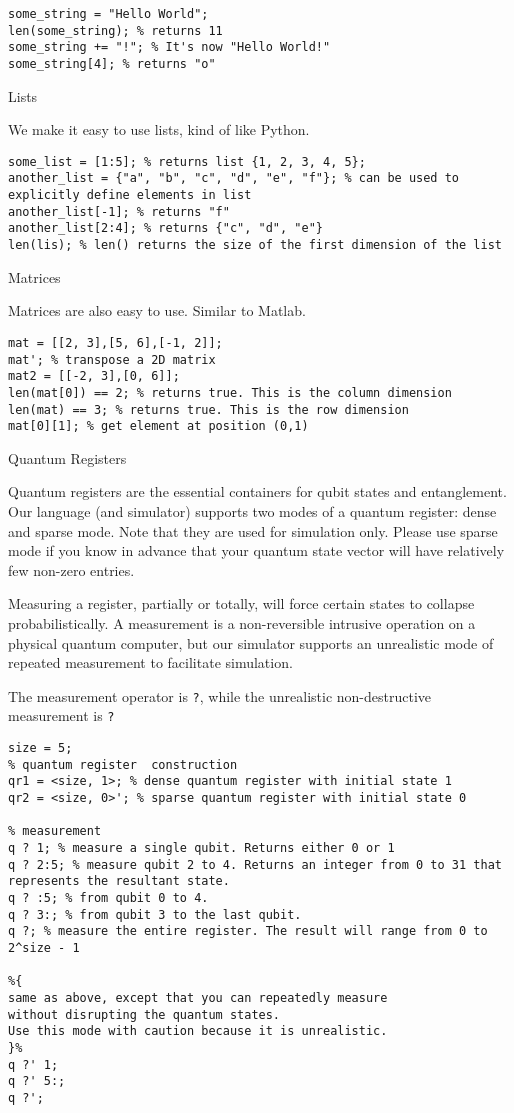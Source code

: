 \documentclass[]{article}
\begin{document}
\begin{verbatim}
some_string = "Hello World";
len(some_string); % returns 11
some_string += "!"; % It's now "Hello World!"
some_string[4]; % returns "o"
\end{verbatim}

Lists

We make it easy to use lists, kind of like Python.

\begin{verbatim}
some_list = [1:5]; % returns list {1, 2, 3, 4, 5};
another_list = {"a", "b", "c", "d", "e", "f"}; % can be used to explicitly define elements in list
another_list[-1]; % returns "f"
another_list[2:4]; % returns {"c", "d", "e"}
len(lis); % len() returns the size of the first dimension of the list
\end{verbatim}

Matrices

Matrices are also easy to use. Similar to Matlab.

\begin{verbatim}
mat = [[2, 3],[5, 6],[-1, 2]];
mat'; % transpose a 2D matrix
mat2 = [[-2, 3],[0, 6]];
len(mat[0]) == 2; % returns true. This is the column dimension
len(mat) == 3; % returns true. This is the row dimension
mat[0][1]; % get element at position (0,1)
\end{verbatim}

Quantum Registers

Quantum registers are the essential containers for qubit states and
entanglement. Our language (and simulator) supports two modes of a
quantum register: dense and sparse mode. Note that they are used for
simulation only. Please use sparse mode if you know in advance that your
quantum state vector will have relatively few non-zero entries.

Measuring a register, partially or totally, will force certain states to
collapse probabilistically. A measurement is a non-reversible intrusive
operation on a physical quantum computer, but our simulator supports an
unrealistic mode of repeated measurement to facilitate simulation.

The measurement operator is \texttt{?}, while the unrealistic
non-destructive measurement is \texttt{?\textquotesingle{}}

\begin{verbatim}
size = 5;
% quantum register  construction
qr1 = <size, 1>; % dense quantum register with initial state 1
qr2 = <size, 0>'; % sparse quantum register with initial state 0

% measurement
q ? 1; % measure a single qubit. Returns either 0 or 1
q ? 2:5; % measure qubit 2 to 4. Returns an integer from 0 to 31 that represents the resultant state.
q ? :5; % from qubit 0 to 4.
q ? 3:; % from qubit 3 to the last qubit. 
q ?; % measure the entire register. The result will range from 0 to 2^size - 1

%{
same as above, except that you can repeatedly measure 
without disrupting the quantum states. 
Use this mode with caution because it is unrealistic.
}%
q ?' 1;
q ?' 5:;
q ?';
\end{verbatim}
\end{document}
